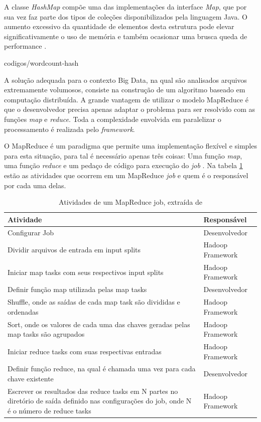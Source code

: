 A classe \textit{HashMap} compõe uma das implementações da interface \textit{Map}, que por sua vez faz parte dos tipos de coleções disponibilizados pela linguagem Java. O aumento excessivo da quantidade de elementos desta estrutura pode elevar significativamente o uso de memória e também ocasionar uma brusca queda de performance \cite{oaks2014}.


		{codigos/wordcount-hash}

A solução adequada para o contexto Big Data, na qual são analisados arquivos extremamente volumosos, consiste na construção de um algoritmo baseado em computação distribuída. A grande vantagem de utilizar o modelo MapReduce é que o desenvolvedor precisa apenas adaptar o problema para ser resolvido com as funções \textit{map} e \textit{reduce}. Toda a complexidade envolvida em paralelizar o processamento é realizada pelo \textit{framework}.

O MapReduce é um paradigma que permite uma implementação flexível e simples para esta situação, para tal é necessário apenas três coisas: Uma função \textit{map}, uma função \textit{reduce} e um pedaço de código para execução do \textit{job} \cite{white2012}. Na tabela \ref{tab-mapreduce-job} estão as atividades que ocorrem em um MapReduce \textit{job} e quem é o responsável por cada uma delas.

\begin{table}[!ht]
\begin{center}
  \begin{tabular}{|p{5cm}|p{5cm}|}
	\hline
	Atividade & Responsável	
	\\ \hline
	Configurar Job & Desenvolvedor
	\\ \hline
	Dividir arquivos de entrada em input splits & Hadoop Framework
	\\ \hline
	Iniciar map tasks com seus respectivos input splits & Hadoop Framework
	\\ \hline
	Definir função map utilizada pelas map tasks & Desenvolvedor
	\\ \hline
	Shuffle, onde as saídas de cada map task são divididas e ordenadas & Hadoop Framework
	\\ \hline
	Sort, onde os valores de cada uma das chaves geradas pelas map tasks são agrupados & Hadoop Framework
	\\ \hline
	Iniciar reduce tasks com suas respectivas entradas & Hadoop Framework
	\\ \hline
	Definir função reduce, na qual é chamada uma vez para cada chave existente & Desenvolvedor
	\\ \hline
	Escrever os resultados das reduce tasks em N partes no diretório de saída definido nas configurações do job, onde N é o número de reduce tasks & Hadoop Framework
	\\ \hline
  \end{tabular}
  \caption{Atividades de um MapReduce job, extraída de 
  }
\label{tab-mapreduce-job}
\end{center}
\end{table}
\FloatBarrier


